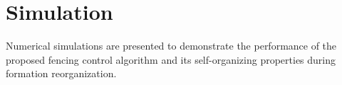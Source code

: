 \section{Simulation}
\label{sec simulation}

Numerical simulations are presented to demonstrate the performance of the proposed fencing control algorithm and its self-organizing properties during formation reorganization.

